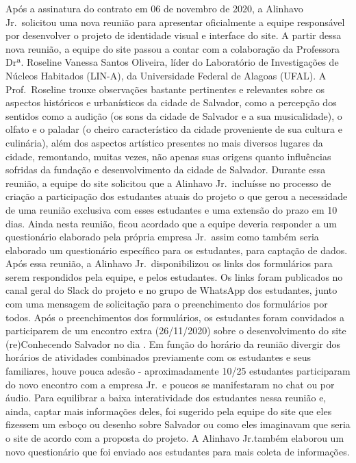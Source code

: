 \documentclass[
]{book}
\begin{document}
Após a assinatura do contrato em 06 de novembro de 2020, a Alinhavo Jr.~solicitou uma nova reunião para apresentar oficialmente a equipe responsável por desenvolver o projeto de identidade visual e interface do site. A partir dessa nova reunião, a equipe do site passou a contar com a colaboração da Professora Drª. Roseline Vanessa Santos Oliveira, líder do Laboratório de Investigações de Núcleos Habitados (LIN-A), da Universidade Federal de Alagoas (UFAL). A Prof.~Roseline trouxe observações bastante pertinentes e relevantes sobre os aspectos históricos e urbanísticos da cidade de Salvador, como a percepção dos sentidos como a audição (os sons da cidade de Salvador e a sua musicalidade), o olfato e o paladar (o cheiro característico da cidade proveniente de sua cultura e culinária), além dos aspectos artístico presentes no mais diversos lugares da cidade, remontando, muitas vezes, não apenas suas origens quanto influências sofridas da fundação e desenvolvimento da cidade de Salvador. Durante essa reunião, a equipe do site solicitou que a Alinhavo Jr.~incluísse no processo de criação a participação dos estudantes atuais do projeto o que gerou a necessidade de uma reunião exclusiva com esses estudantes e uma extensão do prazo em 10 dias. Ainda nesta reunião, ficou acordado que a equipe deveria responder a um questionário elaborado pela própria empresa Jr.~assim como também seria elaborado um questionário específico para os estudantes, para captação de dados. Após essa reunião, a Alinhavo Jr.~disponibilizou os links dos formulários para serem respondidos pela equipe, e pelos estudantes. Os links foram publicados no canal geral do Slack do projeto e no grupo de WhatsApp dos estudantes, junto com uma mensagem de solicitação para o preenchimento dos formulários por todos.
Após o preenchimentos dos formulários, os estudantes foram convidados a participarem de um encontro extra (26/11/2020) sobre o desenvolvimento do site (re)Conhecendo Salvador no dia . Em função do horário da reunião divergir dos horários de atividades combinados previamente com os estudantes e seus familiares, houve pouca adesão - aproximadamente 10/25 estudantes participaram do novo encontro com a empresa Jr.~e poucos se manifestaram no chat ou por áudio. Para equilibrar a baixa interatividade dos estudantes nessa reunião e, ainda, captar mais informações deles, foi sugerido pela equipe do site que eles fizessem um esboço ou desenho sobre Salvador ou como eles imaginavam que seria o site de acordo com a proposta do projeto. A Alinhavo Jr.também elaborou um novo questionário que foi enviado aos estudantes para mais coleta de informações.
\end{document}
